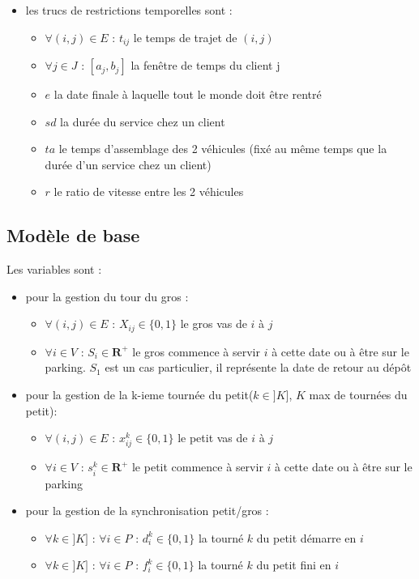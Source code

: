 \documentclass[12pt,a4paper,fleqn]{article}
\begin{document}
\begin{itemize}
\item les trucs de restrictions temporelles sont :
\begin{itemize}
\item $\forall (i,j) \in E \text{ : } t_{ij}$ le temps de trajet de $(i,j)$
\item $\forall j \in J \text{ : } [a_j,b_j]$ la fenêtre de temps du client j
\item $e$ la date finale à laquelle tout le monde doit être rentré
\item $sd$ la durée du service chez un client
\item $ta$ le temps d'assemblage des 2 véhicules (fixé au même temps que la durée d'un service chez un client)
\item $r$ le ratio de vitesse entre les 2 véhicules
\end{itemize}
\end{itemize}

\subsection{Modèle de base}

Les variables sont :
\begin{itemize}
\item pour la gestion du tour du gros :
\begin{itemize}
\item $\forall (i,j) \in E \text{ : } X_{ij} \in \{0,1\}$ le gros vas de $i$ à $j$
\item $\forall i \in V \text{ : } S_i \in \mathbf{R}^+$ le gros commence à servir $i$ à cette date ou à être sur le parking. $S_1$ est un cas particulier, il représente la date de retour au dépôt
\end{itemize}
\item pour la gestion de la k-ieme tournée du petit($k \in ]K]$, $K$ max de tournées du petit):
\begin{itemize}
\item $\forall (i,j) \in E \text{ : } x_{ij}^k \in \{0,1\}$ le petit vas de $i$ à $j$
\item $\forall i \in V \text{ : } s_i^k \in \mathbf{R}^+$ le petit commence à servir $i$ à cette date ou à être sur le parking
\end{itemize}
\item pour la gestion de la synchronisation petit/gros :
\begin{itemize}
\item $\forall k \in ]K] \text{ : } \forall i \in P \text{ : } d^k_i \in \{0,1\}$ la tourné $k$ du petit démarre en $i$ 
\item $\forall k \in ]K] \text{ : } \forall i \in P \text{ : } f^k_i \in \{0,1\}$ la tourné $k$ du petit fini en $i$
\end{itemize}
\end{itemize}
\end{document}
